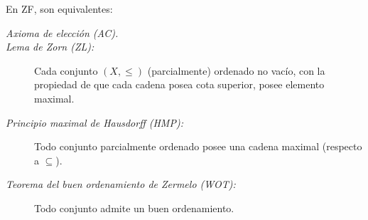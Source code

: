 \documentclass[11pt,oneside,a4paper]{book}
\begin{document}
\begin{thm}
En ZF, son equivalentes:
\begin{description}
\item[\color{thm}\sffamily\itshape Axioma de elección (AC).]
\item[\color{thm}\sffamily\itshape Lema de Zorn (ZL):] Cada conjunto $(X,\leq)$ (parcialmente) ordenado no vacío, con la propiedad de que cada cadena posea cota superior, posee elemento maximal.
\item[\color{thm}\sffamily\itshape Principio maximal de Hausdorff (HMP):] Todo conjunto parcialmente ordenado posee una cadena maximal (respecto a $\subseteq$).
\item[\color{thm}\sffamily\itshape Teorema del buen ordenamiento de Zermelo (WOT):] Todo conjunto admite un buen ordenamiento.
\end{description}
\end{thm}
\end{document}
